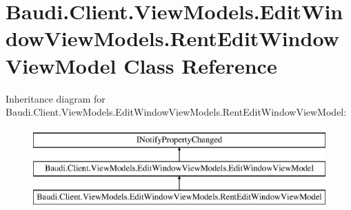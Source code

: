 \hypertarget{class_baudi_1_1_client_1_1_view_models_1_1_edit_window_view_models_1_1_rent_edit_window_view_model}{}\section{Baudi.\+Client.\+View\+Models.\+Edit\+Window\+View\+Models.\+Rent\+Edit\+Window\+View\+Model Class Reference}
\label{class_baudi_1_1_client_1_1_view_models_1_1_edit_window_view_models_1_1_rent_edit_window_view_model}
Inheritance diagram for Baudi.\+Client.\+View\+Models.\+Edit\+Window\+View\+Models.\+Rent\+Edit\+Window\+View\+Model\+:\begin{figure}[H]
\begin{center}
\leavevmode
\includegraphics[height=3.000000cm]{class_baudi_1_1_client_1_1_view_models_1_1_edit_window_view_models_1_1_rent_edit_window_view_model}
\end{center}
\end{figure}
